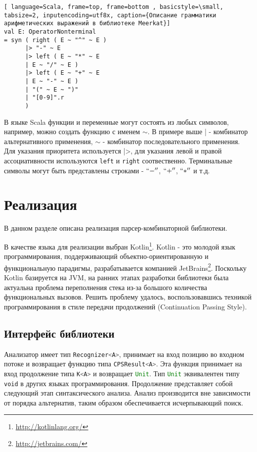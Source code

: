 \documentclass[14pt]{matmex-diploma}
\begin{document}
\begin{lstlisting}[ language=Scala, frame=top, frame=bottom , basicstyle=\small, tabsize=2, inputencoding=utf8x, caption={Описание грамматики арифметических выражений в библиотеке Meerkat}]
val E: OperatorNonterminal
= syn ( right ( E ~ "^" ~ E )
      |> "-" ~ E 
      |> left ( E ~ "*" ~ E 
      | E ~ "/" ~ E )
      |> left ( E ~ "+" ~ E 
      | E ~ "-" ~ E )
      | "(" ~ E ~ ")"
      | "[0-9]".r
      )
\end{lstlisting}
В языке Scala функции и переменные могут состоять из любых символов, например, можно создать функцию с именем $\sim$. В примере выше | - комбинатор альтернативного применения, $\sim$ - комбинатор последовательного применения. Для указания приоритета используется |>, для указания левой и правой ассоциативности используются \lstinline[language=Scala]{left} и \lstinline[language=Scala]{right} соотвественно. Терминальные символы могут быть представлены строками - $``-''$, $``+''$, $``*''$ и т.д.

\section{Реализация}

В данном разделе описана реализация парсер-комбинаторной библиотеки.

В качестве языка для реализации выбран Kotlin\footnote{\url{http://kotlinlang.org/}}. Kotlin - это молодой язык программирования, поддерживающий объектно-ориентированную и функциональную парадигмы, разрабатывается компанией JetBrains\footnote{\url{http://jetbrains.com/}}. Поскольку Kotlin базируется на JVM, на ранних этапах разработки библиотеки была актуальна проблема переполнения стека из-за большого количества функциональных вызовов. Решить проблему удалось, воспользовавшись техникой программирования в стиле передачи продолжений (Continuation Passing Style).
  
    \subsection{Интерфейс библиотеки}
  
Анализатор имеет тип \lstinline[language=Scala]{Recognizer<A>}, принимает на вход позицию во входном потоке и возвращает функцию типа \lstinline[language=Scala]{CPSResult<A>}. Эта функция принимает на вход продолжение типа \lstinline[language=Scala]{K<A>} и возвращает \lstinline[language=Scala]{Unit}. Тип \lstinline[language=Scala]{Unit} эквивалентен типу {\tt void} в других языках программирования. Продолжение представляет собой следующий этап синтаксического анализа. Анализ производится вне зависимости от порядка
    альтернатив, таким образом обеспечивается исчерпывающий поиск. 
    
\end{document}
